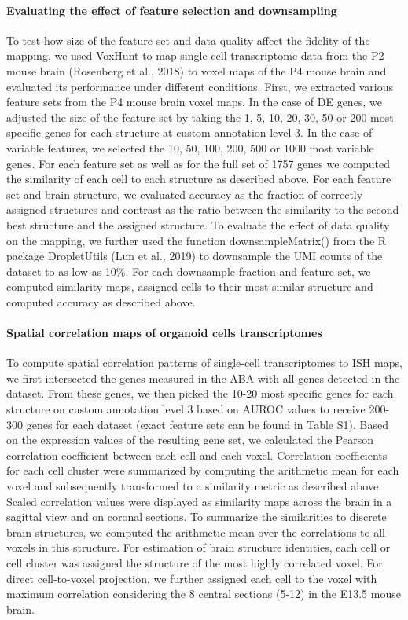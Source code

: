 \paragraph{Evaluating the effect of feature selection and downsampling}
To test how size of the feature set and data quality affect the fidelity of the mapping, we used VoxHunt to map single-cell transcriptome data from the P2 mouse brain (Rosenberg et al., 2018) to voxel maps of the P4 mouse brain and evaluated its performance under different conditions. First, we extracted various feature sets from the P4 mouse brain voxel maps. In the case of DE genes, we adjusted the size of the feature set by taking the 1, 5, 10, 20, 30, 50 or 200 most specific genes for each structure at custom annotation level 3. In the case of variable features, we selected the 10, 50, 100, 200, 500 or 1000 most variable genes. For each feature set as well as for the full set of 1757 genes we computed the similarity of each cell to each structure as described above. For each feature set and brain structure, we evaluated accuracy as the fraction of correctly assigned structures and contrast as the ratio between the similarity to the second best structure and the assigned structure. To evaluate the effect of data quality on the mapping, we further used the function downsampleMatrix() from the R package DropletUtils (Lun et al., 2019) to downsample the UMI counts of the dataset to as low as 10\%. For each downsample fraction and feature set, we computed similarity maps, assigned cells to their most similar structure and computed accuracy as described above.

\paragraph{Spatial correlation maps of organoid cells transcriptomes}
To compute spatial correlation patterns of single-cell transcriptomes to ISH maps, we first intersected the genes measured in the ABA with all genes detected in the dataset. From these genes, we then picked the 10-20 most specific genes for each structure on custom annotation level 3 based on AUROC values to receive 200-300 genes for each dataset (exact feature sets can be found in Table S1). Based on the expression values of the resulting gene set, we calculated the Pearson correlation coefficient between each cell and each voxel. Correlation coefficients for each cell cluster were summarized by computing the arithmetic mean for each voxel and subsequently transformed to a similarity metric as described above. Scaled correlation values were displayed as similarity maps across the brain in a sagittal view and on coronal sections. To summarize the similarities to discrete brain structures, we computed the arithmetic mean over the correlations to all voxels in this structure. For estimation of brain structure identities, each cell or cell cluster was assigned the structure of the most highly correlated voxel.  For direct cell-to-voxel projection, we further assigned each cell to the voxel with maximum correlation considering the 8 central sections (5-12) in the E13.5 mouse brain.

